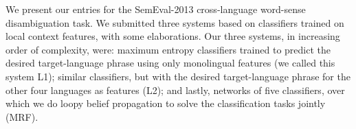 We present our entries for the SemEval-2013 cross-language word-sense disambiguation task. We submitted three systems based on
 classifiers trained on local context features, with some elaborations. Our
 three systems, in increasing order of complexity, were: maximum entropy
 classifiers trained to predict the desired target-language phrase using only
 monolingual features (we called this system L1); similar classifiers,
 but with the desired target-language phrase for the other four languages as
 features (L2); and lastly, networks of five classifiers, over which we
 do loopy belief propagation to solve the classification tasks jointly
 (MRF).

